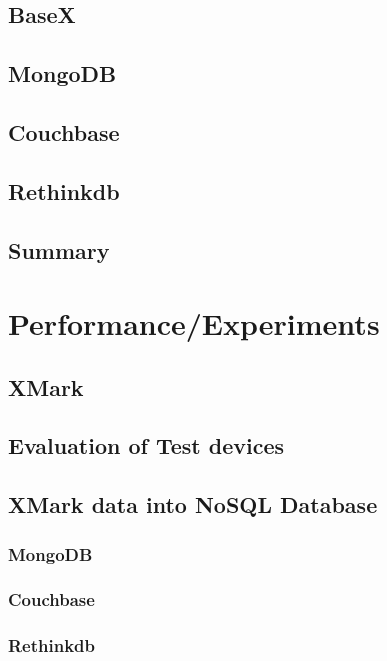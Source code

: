 \documentclass[a4paper,12pt]{article}
\begin{document}
		\subsection{BaseX}
		\subsection{MongoDB}
		\label{couchbase-general}
		\subsection{Couchbase}
		\subsection{Rethinkdb}		
		\subsection{Summary}
	\newpage
	\section{Performance/Experiments}
		\subsection{XMark}
		\label{xmark}
			
		\subsection{Evaluation of Test devices}
		\subsection{XMark data into NoSQL Database}
			\label{xmark-nosql}
			
			\newpage			
			\subsubsection{MongoDB}
			\label{xmark-mongodb}
			
			\subsubsection{Couchbase}
			\label{xmark-couchbase}
			
			\subsubsection{Rethinkdb}
			\label{xmark-rethinkdb}
					
\end{document}
